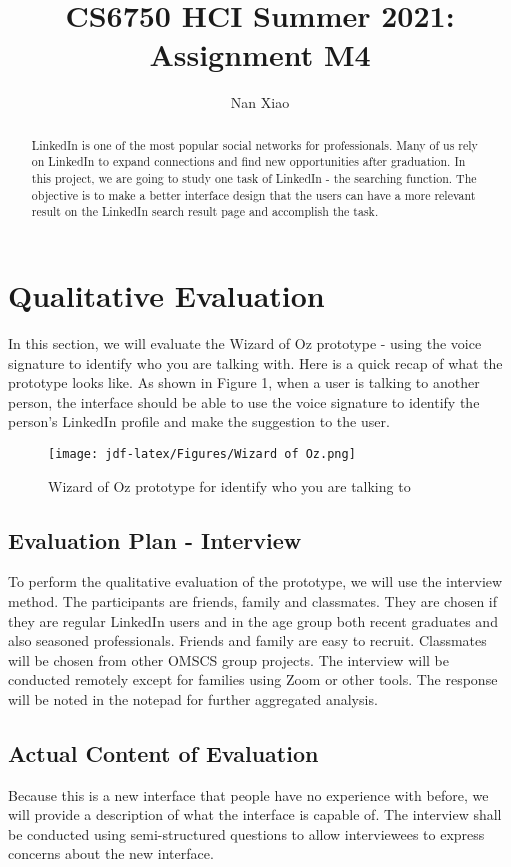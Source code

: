 \documentclass[
	letterpaper, %
]{jdf}
\author{Nan Xiao}
\title{CS6750 HCI Summer 2021:\\Assignment M4}
\begin{document}

\maketitle

\begin{abstract}
	LinkedIn is one of the most popular social networks for professionals. Many of us rely on LinkedIn to expand connections and find new opportunities after graduation. In this project, we are going to study one task of LinkedIn - the searching function. The objective is to make a better interface design that the users can have a more relevant result on the LinkedIn search result page and accomplish the task.
\end{abstract}

\section{Qualitative Evaluation}
In this section, we will evaluate the Wizard of Oz prototype - using the voice signature to identify who you are talking with. Here is a quick recap of what the prototype looks like. As shown in Figure 1, when a user is talking to another person, the interface should be able to use the voice signature to identify the person's LinkedIn profile and make the suggestion to the user.
\begin{figure}[h]
	\centering
	\texttt{[image: jdf-latex/Figures/Wizard of Oz.png]}
	\caption{Wizard of Oz prototype for identify who you are talking to}
	\label{fig:wizard}
\end{figure}

\subsection{Evaluation Plan - Interview}
To perform the qualitative evaluation of the prototype, we will use the interview method. The participants are friends, family and classmates. They are chosen if they are regular LinkedIn users and in the age group both recent graduates and also seasoned professionals. Friends and family are easy to recruit. Classmates will be chosen from other OMSCS group projects. The interview will be conducted remotely except for families using Zoom or other tools. The response will be noted in the notepad for further aggregated analysis.

\subsection{Actual Content of Evaluation}
Because this is a new interface that people have no experience with before, we will provide a description of what the interface is capable of. The interview shall be conducted using semi-structured questions to allow interviewees to express concerns about the new interface.
\end{document}
